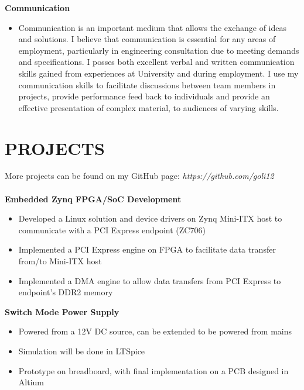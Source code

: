 \documentclass[3pt]{res}
\begin{document}
\begin{resume}
  {\bf Communication} 
        \begin{itemize}
        \item[] Communication is an important medium that allows the exchange of ideas and solutions. I believe that communication is essential for any areas of employment, particularly in engineering consultation due to meeting demands and specifications. I posses both excellent verbal and written communication skills gained from experiences at University and during employment. I use my communication skills to facilitate discussions between team members in projects, provide performance feed back to individuals and provide an effective presentation of complex material, to audiences of varying skills.
       \end{itemize}

   
 
\section{PROJECTS} 
\vspace{0.1in} 
 More projects can be found on my GitHub page: \textit{https://github.com/goli12}  \\
 \\
   {\bf Embedded Zynq FPGA/SoC Development}
    \begin{itemize}[noitemsep] %
      \item Developed a Linux solution and device drivers on Zynq Mini-ITX host to communicate with a PCI Express endpoint (ZC706)
      \item Implemented a PCI Express engine on FPGA to facilitate data transfer from/to Mini-ITX host
      \item Implemented a DMA engine to allow data transfers from PCI Express to endpoint's DDR2 memory
      \end{itemize} 
 
 {\bf Switch Mode Power Supply}
    \begin{itemize}[noitemsep] %
      \item Powered from a 12V DC source, can be extended to be powered from mains
      \item Simulation will be done in LTSpice
      \item Prototype on breadboard, with final implementation on a PCB designed in Altium
      \end{itemize}
      

\end{resume}
\end{document}
